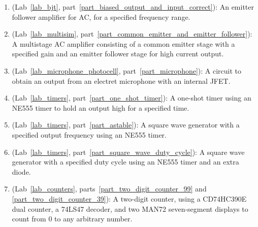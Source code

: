 \begin{flushleft}
\begin{enumerate}[align=left,leftmargin=*]
\item (Lab~\ref{lab_bjt}, part~\ref{part_biased_output_and_input_correct}): An emitter follower amplifier for AC, for a specified frequency range.

\item (Lab~\ref{lab_multisim}, part~\ref{part_common_emitter_and_emitter_follower}): A multistage AC amplifier consisting of a common emitter stage with a specified gain and an emitter follower stage for high current output.

\item (Lab~\ref{lab_microphone_photocell}, part~\ref{part_microphone}): A circuit to obtain an output from an electret microphone with an internal JFET. 

\item (Lab~\ref{lab_timers}, part~\ref{part_one_shot_timer}): A one-shot timer using an NE555 timer to hold an output high for a specified time.

\item (Lab~\ref{lab_timers}, part~\ref{part_astable}): A square wave generator with a specified output frequency using an NE555 timer.

\item (Lab~\ref{lab_timers}, part~\ref{part_square_wave_duty_cycle}): A square wave generator with a specified duty cycle using an NE555 timer and an extra diode. 

\item (Lab~\ref{lab_counters}, parts~\ref{part_two_digit_counter_99} and \ref{part_two_digit_counter_39}): A two-digit counter, using a CD74HC390E dual counter, a 74LS47 decoder, and two MAN72 seven-segment displays to count from 0 to any arbitrary number.
\end{enumerate}
\end{flushleft}